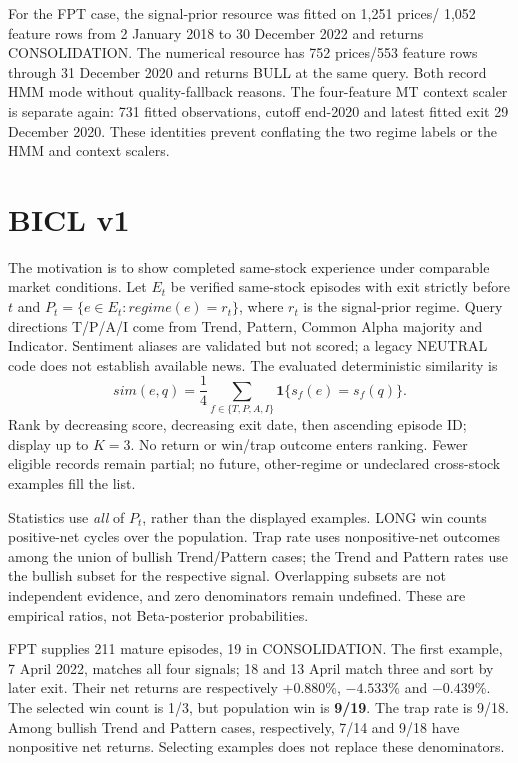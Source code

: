 For the FPT case, the signal-prior resource was fitted on 1,251 prices/
1,052 feature rows from 2 January 2018 to 30 December 2022 and returns
CONSOLIDATION. The numerical resource has 752 prices/553 feature rows
through 31 December 2020 and returns BULL at the same query. Both record
HMM mode without quality-fallback reasons. The four-feature MT context
scaler is separate again: 731 fitted observations, cutoff end-2020 and
latest fitted exit 29 December 2020. These identities prevent conflating
the two regime labels or the HMM and context scalers.

\section{BICL v1}\label{s:b6cb474a799cc0da}
The motivation is to show completed same-stock experience under comparable
market conditions. Let $E_t$ be verified same-stock episodes with exit
strictly before $t$ and $P_t=\{e\in E_t:regime(e)=r_t\}$, where $r_t$ is the
signal-prior regime. Query directions T/P/A/I come from Trend, Pattern,
Common Alpha majority and Indicator. Sentiment aliases are validated but
not scored; a legacy NEUTRAL code does not establish available news.
The evaluated deterministic similarity is
\begin{equation}\label{eq:v1}
sim(e,q)=\frac14\sum_{f\in\{T,P,A,I\}}\mathbf1\{s_f(e)=s_f(q)\}.
\end{equation}
Rank by decreasing score, decreasing exit date, then ascending episode
ID; display up to $K=3$. No return or win/trap outcome enters ranking.
Fewer eligible records remain partial; no future, other-regime or
undeclared cross-stock examples fill the list.

Statistics use \emph{all} of $P_t$, rather than the displayed examples.
LONG win counts positive-net cycles over the population. Trap rate uses
nonpositive-net outcomes among the union of bullish Trend/Pattern cases;
the Trend and Pattern rates use the bullish subset for the respective signal. Overlapping
subsets are not independent evidence, and zero denominators remain
undefined. These are empirical ratios, not Beta-posterior probabilities.

FPT supplies 211 mature episodes, 19 in CONSOLIDATION. The first example,
7 April 2022, matches all four signals; 18 and 13 April match three and
sort by later exit. Their net returns are respectively +0.880\%,
$-4.533$\% and $-0.439$\%. The selected win count is 1/3,
but population win is \textbf{9/19}. The trap rate is 9/18. Among bullish
Trend and Pattern cases, respectively, 7/14 and 9/18 have nonpositive
net returns. Selecting examples does not replace these
denominators.

